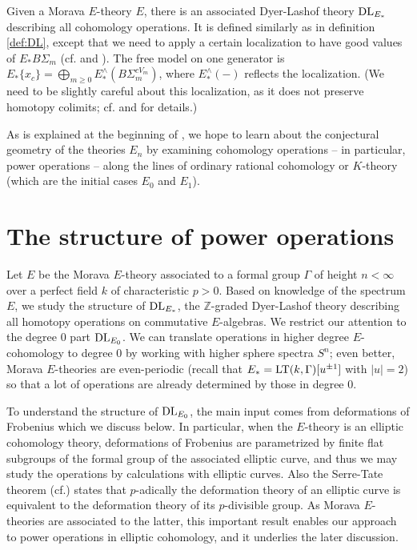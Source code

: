 \documentclass{gtpart}
\theoremstyle{definition}
\theoremstyle{remark}
\newcommand{\mb}[1]{\mathbb{#1}}
\newcommand{\LT}{{\rm LT}}
\newcommand{\DL}{{\rm DL}}
\newcommand{\cff}[2]{cf.\thinspace{\cite[#1]{#2}}}
\begin{document}
Given a Morava $E$-theory $E$, there is an associated Dyer-Lashof theory 
$\DL_{E_*}$ describing all cohomology operations.  It is defined similarly as 
in definition \ref{def:DL}, except that we need to apply a certain 
localization to have good values of $E_* B\Sigma_m$ 
(\cff{section 3}{strickland} and \cite[section 8]{hoveystrickland}).  The free 
model on one generator is $E_*\{x_c\} = \bigoplus_{m \ge 0} E_*^\wedge 
(B\Sigma_m^{cV_m})$, where $E_*^\wedge (-)$ reflects the localization.  (We 
need to be slightly careful about this localization, as it does not preserve 
homotopy colimits; \cff{section 15}{lpo} and \cite[section 1]{hovey} for 
details.)  

As is explained at the beginning of \cite{Andu}, we hope to learn about the 
conjectural geometry of the theories $E_n$ by examining cohomology operations 
-- in particular, power operations -- along the lines of ordinary rational 
cohomology or $K$-theory (which are the initial cases $E_0$ and $E_1$).  


\section{The structure of power operations}
\label{sec:at2ec}

Let $E$ be the Morava $E$-theory associated to a formal group $\Gamma$ of 
height $n<\infty$ over a perfect field $k$ of characteristic $p>0$.  Based on 
knowledge of the spectrum $E$, we study the structure of $\DL_{E_*}$, the 
$\mb Z$-graded Dyer-Lashof theory describing all homotopy operations on 
commutative $E$-algebras.  We restrict our attention to the degree 0 part 
$\DL_{E_0}$.  We can translate operations in higher degree $E$-cohomology to 
degree 0 by working with higher sphere spectra $S^n$; even better, Morava 
$E$-theories are even-periodic (recall that $E_* = \LT(k,\Gamma)[u^{\pm1}]$ 
with $|u| = 2$) so that a lot of operations are already determined by those in 
degree 0.  

To understand the structure of $\DL_{E_0}$, the main input comes from 
deformations of Frobenius which we discuss below.  In particular, when the 
$E$-theory is an elliptic cohomology theory, deformations of Frobenius are 
parametrized by finite flat subgroups of the formal group of the associated 
elliptic curve, and thus we may study the operations by calculations with 
elliptic curves.  Also the Serre-Tate theorem (\cff{theorem 1.2.1}{katz}) 
states that $p$-adically the deformation theory of an elliptic curve is 
equivalent to the deformation theory of its $p$-divisible group.  As Morava 
$E$-theories are associated to the latter, this important result enables our 
approach to power operations in elliptic cohomology, and it underlies the 
later discussion.  
\end{document}
